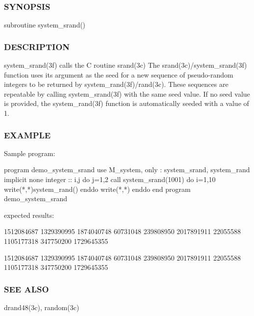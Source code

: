\subsubsection*{S\+Y\+N\+O\+P\+S\+IS}

\begin{DoxyVerb}subroutine system_srand()
\end{DoxyVerb}


\subsubsection*{D\+E\+S\+C\+R\+I\+P\+T\+I\+ON}

system\+\_\+srand(3f) calls the C routine srand(3c) The srand(3c)/system\+\_\+srand(3f) function uses its argument as the seed for a new sequence of pseudo-\/random integers to be returned by system\+\_\+rand(3f)/rand(3c). These sequences are repeatable by calling system\+\_\+srand(3f) with the same seed value. If no seed value is provided, the system\+\_\+rand(3f) function is automatically seeded with a value of 1.

\subsubsection*{E\+X\+A\+M\+P\+LE}

\begin{DoxyVerb}Sample program:

   program demo_system_srand
   use M_system, only : system_srand, system_rand
   implicit none
   integer :: i,j
   do j=1,2
      call system_srand(1001)
      do i=1,10
         write(*,*)system_rand()
      enddo
      write(*,*)
   enddo
   end program demo_system_srand
\end{DoxyVerb}
 expected results\+:

1512084687 1329390995 1874040748 60731048 239808950 2017891911 22055588 1105177318 347750200 1729645355

1512084687 1329390995 1874040748 60731048 239808950 2017891911 22055588 1105177318 347750200 1729645355

\subsubsection*{S\+EE A\+L\+SO}

drand48(3c), random(3c) \mbox{\label{namespacem__system_ab80f033f884f3c88c3c010826143b6f5}} 
